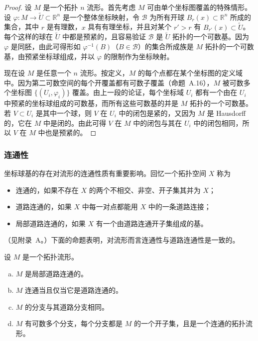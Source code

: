 \documentclass[../../main.tex]{subfiles}
\begin{document}
\begin{proof}
设 $M$ 是一个拓扑 $n$ 流形。首先考虑 $M$ 可由单个坐标图覆盖的特殊情形。设 $\varphi:M\to\widetilde{U}\subset\mathbb{R}^{n}$ 是一个整体坐标映射，令 $\mathcal{B}$ 为所有开球 $B_{r}(x)\subset\mathbb{R}^{n}$ 所成的集合，其中 $r$ 是有理数，$x$ 具有有理坐标，并且对某个 $r'>r$ 有 $B_{r'}(x)\subset\widetilde{U}$。每个这样的球在 $\widetilde{U}$ 中都是预紧的，且容易验证 $\mathcal{B}$ 是 $\widetilde{U}$ 拓扑的一个可数基。因为 $\varphi$ 是同胚，由此可得形如 $\varphi^{-1}(B)$（$B\in\mathcal{B}$）的集合所成族是 $M$ 拓扑的一个可数基，由预紧坐标球组成，并以 $\varphi$ 的限制作为坐标映射。

现在设 $M$ 是任意一个 $n$ 流形。按定义，$M$ 的每个点都在某个坐标图的定义域中。因为第二可数空间的每个开覆盖都有可数子覆盖（命题~A.16），$M$ 被可数多个坐标图 $\{(U_{i},\varphi_{i})\}$ 覆盖。由上一段的论证，每个坐标域 $U_{i}$ 都有一个由在 $U_{i}$ 中预紧的坐标球组成的可数基，而所有这些可数基的并是 $M$ 拓扑的一个可数基。若 $V\subset U_{i}$ 是其中一个球，则 $V$ 在 $U_{i}$ 中的闭包是紧的，又因为 $M$ 是 Hausdorff 的，它在 $M$ 中是闭的。由此可得 $V$ 在 $M$ 中的闭包与其在 $U_{i}$ 中的闭包相同，所以 $V$ 在 $M$ 中也是预紧的。
\end{proof}

\subsubsection{连通性}\label{subsubsection:ch01-连通性}

坐标球基的存在对流形的连通性质有重要影响。回忆一个拓扑空间 $X$ 称为

\begin{itemize}
\item 连通的，如果不存在 $X$ 的两个不相交、非空、开子集其并为 $X$；
\item 道路连通的，如果 $X$ 中每一对点都能用 $X$ 中的一条道路连接；
\item 局部道路连通的，如果 $X$ 有一个由道路连通开子集组成的基。
\end{itemize}

（见附录~A。）下面的命题表明，对流形而言连通性与道路连通性是一致的。

\begin{proposition}\label{proposition:ch01-连通与道路连通}
设 $M$ 是一个拓扑流形。
\begin{enumerate}[(a)]
\item $M$ 是局部道路连通的。
\item $M$ 连通当且仅当它是道路连通的。
\item $M$ 的分支与其道路分支相同。
\item $M$ 有可数多个分支，每个分支都是 $M$ 的一个开子集，且是一个连通的拓扑流形。
\end{enumerate}
\end{proposition}
\end{document}
